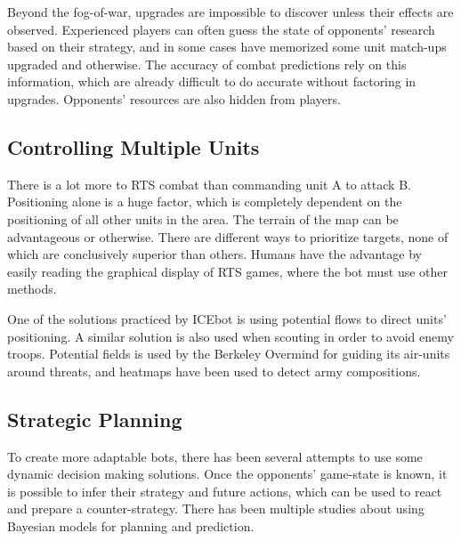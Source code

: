 	Beyond the fog-of-war, upgrades are impossible to discover unless their effects are observed. Experienced players can often guess the state of opponents' research based on their strategy, and in some cases have memorized some unit match-ups upgraded and otherwise. The accuracy of combat predictions rely on this information, which are already difficult to do accurate without factoring in upgrades. Opponents' resources are also hidden from players.
	
	\subsection*{Controlling Multiple Units}
	There is a lot more to RTS combat than commanding unit A to attack B. Positioning alone is a huge factor, which is completely dependent on the positioning of all other units in the area. The terrain of the map can be advantageous or otherwise. There are different ways to prioritize targets, none of which are conclusively superior than others. Humans have the advantage by easily reading the graphical display of RTS games, where the bot must use other methods.
	
	One of the solutions practiced by ICEbot is using potential flows to direct units' positioning. A similar solution is also used when scouting in order to avoid enemy troops. Potential fields is used by the Berkeley Overmind for guiding its air-units around threats, and heatmaps have been used to detect army compositions. \cite{Overmind} \cite{Potential12} \cite{PotentialNav}

	\subsection*{Strategic Planning}
	To create more adaptable bots, there has been several attempts to use some dynamic decision making solutions. Once the opponents' game-state is known, it is possible to infer their strategy and future actions, which can be used to react and prepare a counter-strategy. There has been multiple studies about using Bayesian models for planning and prediction. \cite{BayTac}